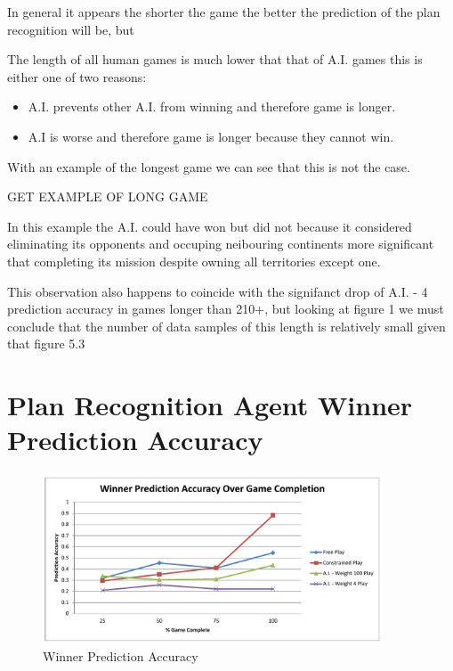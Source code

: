 \documentclass[parskip]{cs4rep}
\begin{document}
In general it appears the shorter the game the better the prediction of the plan recognition will be, but

The length of all human games is much lower that that of A.I. games this is either one of two reasons:

\begin{itemize}
\item
A.I. prevents other A.I. from winning and therefore game is longer.
\item
A.I is worse and therefore game is longer because they cannot win.
\end{itemize}

With an example of the longest game we can see that this is not the case.

GET EXAMPLE OF LONG GAME

In this example the A.I. could have won but did not because it considered eliminating its opponents and occuping neibouring continents more significant that completing its mission despite owning all territories except one.

This observation also happens to coincide with the signifanct drop of A.I. - 4 prediction accuracy in games longer than 210+, but looking at figure 1 we must conclude that the number of data samples of this length is relatively small given that figure 5.3 

\section{Plan Recognition Agent Winner Prediction Accuracy}

\newpage

\begin{figure}[h]
\centerline{
\includegraphics[width=0.9\textwidth]{images/winner-game-complete.pdf}
}
\caption{Winner Prediction Accuracy}
\label{fig:winner-pred-accuracy}
\end{figure} 
\end{document}
